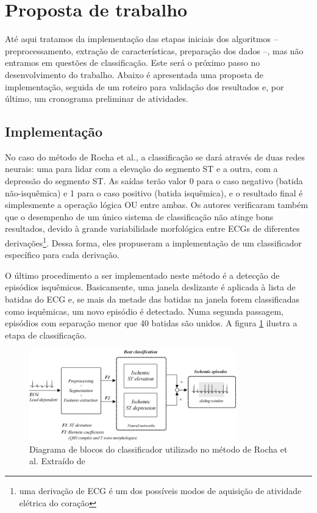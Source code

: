 
\section{Proposta de trabalho}
\label{sec:section5}
Até aqui tratamos da implementação das etapas iniciais dos algoritmos -- preprocessamento, extração de características, preparação dos dados --, mas não entramos em questões de classificação. Este será o próximo passo no desenvolvimento do trabalho. Abaixo é apresentada uma proposta de implementação, seguida de um roteiro para validação dos resultados e, por último, um cronograma preliminar de atividades.

\subsection{Implementação}
No caso do método de Rocha et al., a classificação se dará através de duas redes neurais: uma para lidar com a elevação do segmento ST e a outra, com a depressão do segmento ST. As saídas terão valor 0 para o caso negativo (batida não-isquêmica) e 1 para o caso positivo (batida isquêmica), e o resultado final é simplesmente a operação lógica OU entre ambas. Os autores verificaram também que o desempenho de um único sistema de classificação não atinge bons resultados, devido à grande variabilidade morfológica entre ECGs de diferentes derivações\footnote{uma derivação de ECG é um dos possíveis modos de aquisição de atividade elétrica do coração}. Dessa forma, eles propuseram a implementação de um classificador específico para cada derivação.

O último procedimento a ser implementado neste método é a detecção de episódios isquêmicos. Basicamente, uma janela deslizante é aplicada à lista de batidas do ECG e, se mais da metade das batidas na janela  forem classificadas como isquêmicas, um novo episódio é detectado. Numa segunda passagem, episódios com separação menor que 40 batidas são unidos. A figura \ref{fig:rocha_03} ilustra a etapa de classificação.

\begin{figure}[ht]
    \centering
    \includegraphics[width=0.8\textwidth]{figures/rocha_03.png}
    \caption{Diagrama de blocos do classificador utilizado no método de Rocha et al. Extraído de \cite{Rocha10}}
    \label{fig:rocha_03}
\end{figure}


